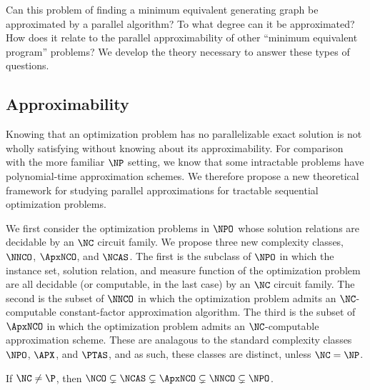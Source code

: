 \documentclass{article}
\begin{document}
Can this problem of finding a minimum equivalent generating graph be approximated by a parallel algorithm?
To what degree can it be approximated?
How does it relate to the parallel approximability of other ``minimum equivalent program'' problems?
We develop the theory necessary to answer these types of questions.

\subsection{Approximability}


Knowing that an optimization problem has no parallelizable exact solution is not wholly satisfying without knowing about its approximability.
For comparison with the more familiar $\NP$ setting, we know that some intractable problems have polynomial-time approximation schemes.
We therefore propose a new theoretical framework for studying parallel approximations for tractable sequential optimization problems. %

We first consider the optimization problems in $\NPO$ whose solution relations are decidable by an $\NC$ circuit family.
We propose three new complexity classes, $\NNCO$, $\ApxNCO$, and $\NCAS$.
The first is the subclass of $\NPO$ in which the instance set, solution relation, and measure function of the optimization problem are all decidable (or computable, in the last case) by an $\NC$ circuit family.
The second is the subset of $\NNCO$ in which the optimization problem admits an $\NC$-computable constant-factor approximation algorithm.
The third is the subset of $\ApxNCO$ in which the optimization problem admits an $\NC$-computable approximation scheme.
These are analagous to the standard complexity classes $\NPO$, $\APX$, and $\PTAS$, and as such, these classes are distinct, unless $\NC = \NP$.

\begin{theorem}
  If $\NC \neq \P$, then
  $\NCO \subsetneq \NCAS \subsetneq \ApxNCO \subsetneq \NNCO \subsetneq \NPO$.
\end{theorem}
\end{document}
